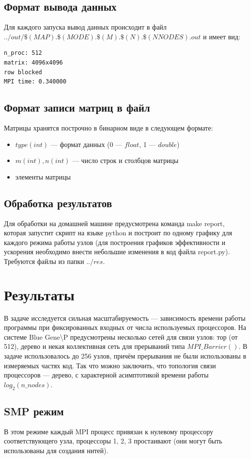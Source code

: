 \documentclass[14pt]{extarticle}
\begin{document}
\subsection{Формат вывода данных}
Для каждого запуска вывод данных происходит в файл  \\ $../out/\$(MAP).\$(MODE).\$(M).\$(N).\$(NNODES).out$ и имеет вид:
\begin{lstlisting}
n_proc: 512
matrix: 4096x4096
row blocked
MPI time: 0.340000
\end{lstlisting}

\subsection{Формат записи матриц в файл}
Матрицы хранятся построчно в бинарном виде в следующем формате:
\begin{itemize}
\item $type(int)$ --- формат данных (0 --- $float$, 1 --- $double$)
\item $m(int), n(int)$ --- число строк и столбцов матрицы
\item элементы матрицы
\end{itemize}

\subsection{Обработка результатов}
Для обработки на домашней машине предусмотрена команда make report, которая запустит скрипт на языке python и построит по одному графику для каждого режима работы узлов (для построения графиков эффективности и ускорения необходимо внести небольшие изменения в код файла report.py). Требуются файлы из папки $../res$.

\section{Результаты}
В задаче исследуется сильная масштабируемость --- зависимость времени работы программы при фиксированных входных от числа используемых процессоров. На системе Blue Gene\textbackslash P предусмотрены несколько сетей для связи узлов: тор (от 512), дерево и некая коллективная сеть для прерываний типа $MPI\_Barrier()$. В задаче использовалось до 256 узлов, причём прерывания не были использованы в измеряемых частях код. Так что можно заключить, что топология связи процессоров --- дерево, с характерной асимптотикой времени работы $log_2(n\_nodes)$.

\subsection{SMP режим}
В этом режиме каждый MPI процесс привязан к нулевому процессору соответствующего узла, процессоры 1, 2, 3 простаивают (они могут быть использованы для создания нитей).
\end{document}
